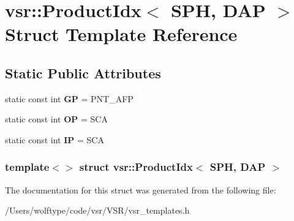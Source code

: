 \hypertarget{structvsr_1_1_product_idx_3_01_s_p_h_00_01_d_a_p_01_4}{\section{vsr\-:\-:Product\-Idx$<$ S\-P\-H, D\-A\-P $>$ Struct Template Reference}
\label{structvsr_1_1_product_idx_3_01_s_p_h_00_01_d_a_p_01_4}
}
\subsection*{Static Public Attributes}
\begin{DoxyCompactItemize}
\item 
\hypertarget{structvsr_1_1_product_idx_3_01_s_p_h_00_01_d_a_p_01_4_a7daa7a3ba08e19fb9e167e075608b938}{static const int {\bfseries G\-P} = P\-N\-T\-\_\-\-A\-F\-P}\label{structvsr_1_1_product_idx_3_01_s_p_h_00_01_d_a_p_01_4_a7daa7a3ba08e19fb9e167e075608b938}

\item 
\hypertarget{structvsr_1_1_product_idx_3_01_s_p_h_00_01_d_a_p_01_4_a34a6f083fc85dfbfd7613f983e8f2848}{static const int {\bfseries O\-P} = S\-C\-A}\label{structvsr_1_1_product_idx_3_01_s_p_h_00_01_d_a_p_01_4_a34a6f083fc85dfbfd7613f983e8f2848}

\item 
\hypertarget{structvsr_1_1_product_idx_3_01_s_p_h_00_01_d_a_p_01_4_a34b9d12b3cd1c24ef6cff37eb68d908d}{static const int {\bfseries I\-P} = S\-C\-A}\label{structvsr_1_1_product_idx_3_01_s_p_h_00_01_d_a_p_01_4_a34b9d12b3cd1c24ef6cff37eb68d908d}

\end{DoxyCompactItemize}
\subsubsection*{template$<$$>$ struct vsr\-::\-Product\-Idx$<$ S\-P\-H, D\-A\-P $>$}



The documentation for this struct was generated from the following file\-:\begin{DoxyCompactItemize}
\item 
/\-Users/wolftype/code/vsr/\-V\-S\-R/vsr\-\_\-templates.\-h\end{DoxyCompactItemize}
